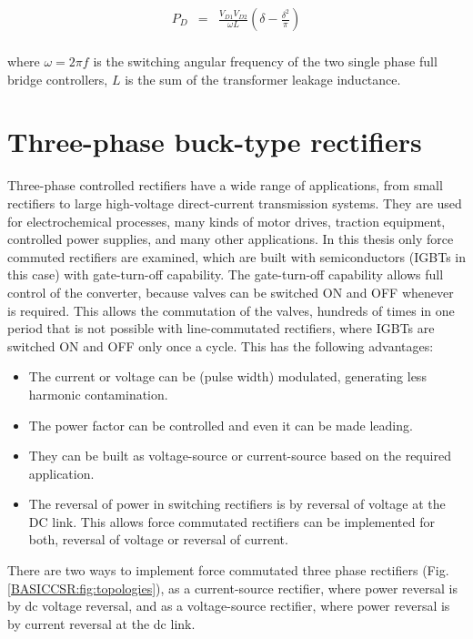 \begin{equation}
        \begin{array}{rcl}
            P_D&=&\frac{V_{D1}V_{D2}}{\omega L}\left(\delta-\frac{\delta^2}{\pi}\right)\\
        \end{array}
        \label{BASICMPC:equ:DCDC}
    \end{equation}
		
		where $\omega=2\pi f$ is the switching angular frequency of the two single phase full bridge controllers, $L$ is the
sum of the transformer leakage inductance. 

\section{Three-phase buck-type rectifiers}\label{BASICCSR:sec:CSR}

Three-phase controlled rectifiers have a wide range of applications, from small rectifiers to large high-voltage direct-current
transmission systems. They are used for electrochemical processes, many kinds of motor drives, traction equipment, controlled power supplies, and many other applications. In this thesis only force commuted rectifiers are examined, which are built with semiconductors (IGBTs in this case) with gate-turn-off capability. The gate-turn-off capability allows full control of the converter, because valves can be switched ON and OFF whenever is required. This allows the commutation of the valves, hundreds of times in one period that is not possible with line-commutated rectifiers, where IGBTs are switched ON and OFF only once a cycle. This has the following advantages:

\begin{itemize}
\item The current or voltage can be (pulse width) modulated, generating less harmonic contamination.
\item The power factor can be controlled and even it can be made leading.
\item They can be built as voltage-source or current-source based on the required application.
\item The reversal of power in switching rectifiers is by reversal of voltage at the DC link. This allows force commutated rectifiers can be implemented for both, reversal of voltage or reversal of current.
\end{itemize}

There are two ways to implement force commutated three phase rectifiers (Fig.\ref{BASICCSR:fig:topologies}), as a current-source rectifier, where power reversal is by dc voltage reversal, and as a voltage-source rectifier, where power reversal is by current reversal at the dc link.

